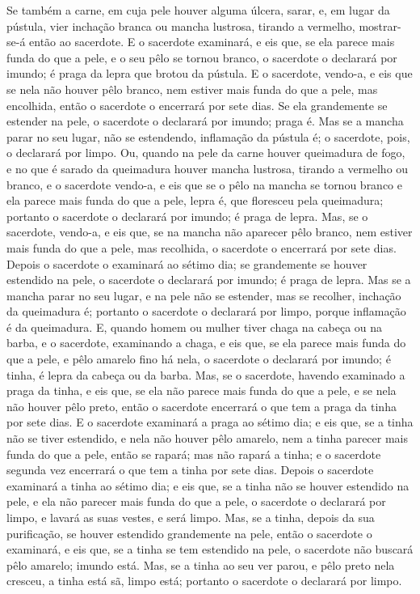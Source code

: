 Se também a carne, em cuja pele houver alguma úlcera, sarar,
e, em lugar da pústula, vier inchação branca ou mancha
lustrosa, tirando a vermelho, mostrar-se-á então ao sacerdote.
E o sacerdote examinará, e eis que, se ela parece mais funda
do que a pele, e o seu pêlo se tornou branco, o sacerdote o
declarará por imundo; é praga da lepra que brotou da pústula.
E o sacerdote, vendo-a, e eis que se nela não houver pêlo
branco, nem estiver mais funda do que a pele, mas encolhida, então o
sacerdote o encerrará por sete dias. Se ela grandemente se
estender na pele, o sacerdote o declarará por imundo; praga é.
Mas se a mancha parar no seu lugar, não se estendendo,
inflamação da pústula é; o sacerdote, pois, o declarará por limpo.
Ou, quando na pele da carne houver queimadura de fogo, e no
que é sarado da queimadura houver mancha lustrosa, tirando a
vermelho ou branco, e o sacerdote vendo-a, e eis que se o
pêlo na mancha se tornou branco e ela parece mais funda do que a
pele, lepra é, que floresceu pela queimadura; portanto o sacerdote o
declarará por imundo; é praga de lepra. Mas, se o sacerdote,
vendo-a, e eis que, se na mancha não aparecer pêlo branco, nem
estiver mais funda do que a pele, mas recolhida, o sacerdote o
encerrará por sete dias. Depois o sacerdote o examinará ao
sétimo dia; se grandemente se houver estendido na pele, o sacerdote
o declarará por imundo; é praga de lepra. Mas se a mancha
parar no seu lugar, e na pele não se estender, mas se recolher,
inchação da queimadura é; portanto o sacerdote o declarará por
limpo, porque inflamação é da queimadura. E, quando homem ou
mulher tiver chaga na cabeça ou na barba, e o sacerdote,
examinando a chaga, e eis que, se ela parece mais funda do que a
pele, e pêlo amarelo fino há nela, o sacerdote o declarará por
imundo; é tinha, é lepra da cabeça ou da barba. Mas, se o
sacerdote, havendo examinado a praga da tinha, e eis que, se ela não
parece mais funda do que a pele, e se nela não houver pêlo preto,
então o sacerdote encerrará o que tem a praga da tinha por sete
dias. E o sacerdote examinará a praga ao sétimo dia; e eis
que, se a tinha não se tiver estendido, e nela não houver pêlo
amarelo, nem a tinha parecer mais funda do que a pele, então
se rapará; mas não rapará a tinha; e o sacerdote segunda vez
encerrará o que tem a tinha por sete dias. Depois o sacerdote
examinará a tinha ao sétimo dia; e eis que, se a tinha não se houver
estendido na pele, e ela não parecer mais funda do que a pele, o
sacerdote o declarará por limpo, e lavará as suas vestes, e será
limpo. Mas, se a tinha, depois da sua purificação, se houver
estendido grandemente na pele, então o sacerdote o examinará,
e eis que, se a tinha se tem estendido na pele, o sacerdote não
buscará pêlo amarelo; imundo está. Mas, se a tinha ao seu ver
parou, e pêlo preto nela cresceu, a tinha está sã, limpo está;
portanto o sacerdote o declarará por limpo.

